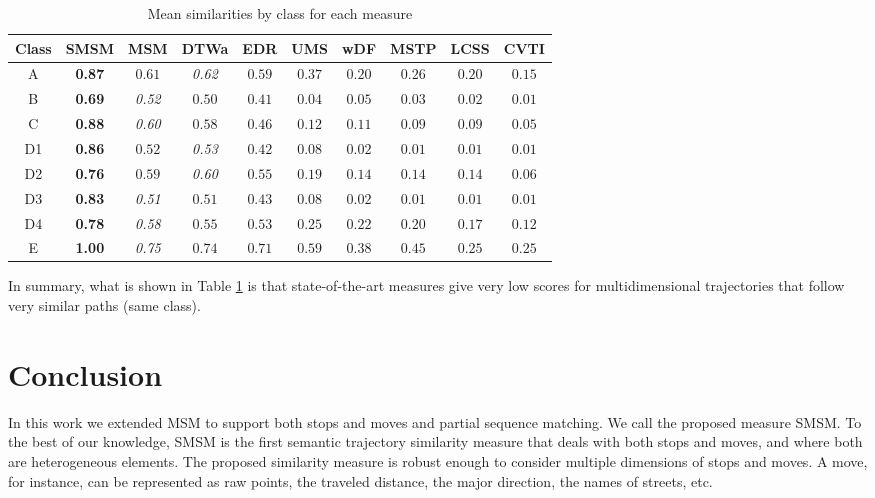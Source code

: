 \documentclass[12pt]{article}
\begin{document}
\begin{table}[ht!]
\footnotesize
  \centering
  \begin{tabular}{|c|c|c|c|c|c|c|c|c|c|}
  	\hline
 Class & SMSM & MSM & DTWa & EDR & UMS & wDF & MSTP & LCSS & CVTI \\
  	\hline
 A & \textbf{0.87} & $0.61$ & \textit{0.62} & $ 0.59$ & $0.37$ & $0.20$& $0.26$ & $0.20$ & $0.15$  \\
 B & \textbf{0.69} & \textit{0.52} & $0.50$ & $ 0.41$ & $0.04$ & $0.05$& $0.03$ & $0.02$ & $0.01$ \\
 C & \textbf{0.88} & \textit{0.60} & $0.58$ & $ 0.46$ & $0.12$ & $0.11$& $0.09$ & $0.09$ & $0.05$ \\
D1 & \textbf{0.86} & $0.52$ & \textit{0.53} & $ 0.42$ & $0.08$ & $0.02$& $0.01$ & $0.01$ & $0.01$ \\
D2 & \textbf{0.76} & $0.59$ & \textit{0.60} & $ 0.55$ & $0.19$ & $0.14$& $0.14$ & $0.14$ & $0.06$ \\
D3 & \textbf{0.83} & \textit{0.51} & $0.51$ & $ 0.43$ & $0.08$ & $0.02$& $0.01$ & $0.01$ & $0.01$ \\
D4 & \textbf{0.78} & \textit{0.58} & $0.55$ & $ 0.53$ & $0.25$ & $0.22$& $0.20$ & $0.17$ & $0.12$ \\
E  & \textbf{1.00} & \textit{0.75} & $0.74$ & $ 0.71$ & $0.59$ & $0.38$& $0.45$ & $0.25$ & $0.25$ \\
    \hline
  \end{tabular}
  \caption{Mean similarities by class for each measure}
  \label{tab:geolife_similaritymeans}
\end{table}

In summary, what is shown in Table \ref{tab:geolife_similaritymeans} is that state-of-the-art measures give very low scores for multidimensional trajectories that follow very similar paths (same class).
\section{Conclusion} \label{sec:conclusions}
In this work we extended MSM to support both stops and moves and partial sequence matching. We call the proposed measure SMSM. To the best of our knowledge, SMSM is the first semantic trajectory similarity measure that deals with both stops and moves, and where both are heterogeneous elements. 
The proposed similarity measure is robust enough to consider multiple dimensions of stops and moves. A move, for instance, can be represented as raw points, the traveled distance, the major direction, the names of streets, etc.
\end{document}
